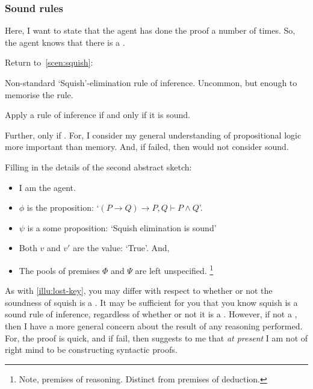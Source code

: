 \subsubsection{Sound rules}

\begin{note}
  Here, I want to state that the agent has done the proof a number of times.
  So, the agent knows that there is a \pevent{}.
\end{note}

\begin{note}
  Return to~\autoref{scen:squish}:

  \scenarioPLSquish*

  Non-standard `Squish'-elimination rule of inference.
  Uncommon, but enough to memorise the rule.

  Apply a rule of inference if and only if it is sound.

  Further, only if \fc{}.
  For, I consider my general understanding of propositional logic more important than memory.
  And, if failed, then would not consider sound.
\end{note}

\begin{note}
  Filling in the details of the second abstract sketch:
  \begin{itemize}[noitemsep]
  \item
    I am the agent.
  \item
    \(\phi\) is the proposition: `\((P \rightarrow Q) \rightarrow P, Q \vdash P \land Q\)'.
  \item
    \(\psi\) is a some proposition: `Squish elimination is sound'
  \item
    Both \(v\) and \(v'\) are the value: `True'.
    And,
  \item
    The pools of premises \(\Phi\) and \(\Psi\) are left unspecified.%
    \footnote{
      Note, premises of reasoning.
      Distinct from premises of deduction.
    }
  \end{itemize}
\end{note}

\begin{note}
  As with \autoref{illu:lost-key}, you may differ with respect to whether or not the soundness of squish is a \requ{}.
  It may be sufficient for you that you know squish is a sound rule of inference, regardless of whether or not it is a \fc{}.
  However, if not a \fc{}, then I have a more general concern about the result of any reasoning performed.
  For, the proof is quick, and if fail, then suggests to me that \emph{at present} I am not of right mind to be constructing syntactic proofs.
\end{note}


